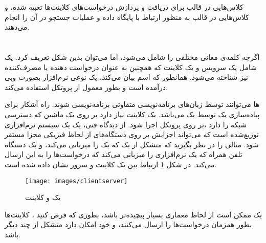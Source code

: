 \documentclass[oneside]{report}
\begin{document}
		کلاس‌هایی در قالب 
		{\normalsize{}}
		برای دریافت و پردازش درخواست‌های کلاینت‌ها تعبیه شده، و کلاس‌هایی در قالب
		{\normalsize{}}
		به منظور ارتباط با پایگاه داده و عملیات جستجو در آن‌ را انجام می‌دهند. 
		
	\section{{\large{}}}
اگرچه کلمه‌ی 
{\normalsize{}}
معانی مختلفی را شامل می‌شود، اما می‌توان بدین شکل تعریف کرد. یک 
{\normalsize{}}
شامل یک سرویس و یک کلاینت که همچنین به عنوان درخواست دهنده یا مصرف‌کننده نیز شناخته می‌شود. همانطور که  اسم 
{\normalsize{}}
بیان می‌کند، یک 
{\normalsize{}}
نوعی نرم‌افزار بصورت وبی درآمده است و بطور معمول از پروتکل 
{\normalsize{}}
استفاده می‌کند. 
		
		{\normalsize{}} ها
		می‌توانند توسط زبان‌های برنامه‌نویسی متفاوتی برنامه‌نویسی شوند. راه آشکار برای پیاده‌سازی یک 
		{\normalsize{}}
		توسط یک 
		{\normalsize{}}
		می‌باشد. یک کلاینت 
		{\normalsize{}}
	نیاز دارد بر روی یک ماشین که دسترسی شبکه را دارد ،بر روی پروتکل
			{\normalsize{}}
			اجرا شود. از دیدگاه فنی،  یک
					{\normalsize{}} 
			یک سیستم نرم‌افزاری توزیع‌شده است که می‌تواند اجزایش بر روی دستگاه‌های از لحاظ فیزیکی مجزا مستقر شود. 
			مثالی را در نظر بگیرید که متشکل از یک 
					{\normalsize{}}
	که یک 
			{\normalsize{}}
			را میزبانی می‌کند، و یک دستگاه تلفن همراه که یک نرم‌افزاری را میزبانی می‌کند که درخواست‌ها را به این 
					{\normalsize{}}
					ارسال می‌‌کند. در شکل 
					\ref{fig:clientserver}
	ارتباط بین یک کلاینت و سرور نشان داده شده است. 
					
					\begin{figure}[h]
						\centering
						\texttt{[image: images/clientserver]}
						\caption{یک {\footnotesize{}} و کلاینت}
						\label{fig:clientserver}
					\end{figure}
یک 
		{\normalsize{}}
		ممکن است از لحاظ معماری بسیار پیچیده‌تر باشد، بطوری که فرض کنید ، کلاینت‌ها بطور همزمان درخواست‌ها را ارسال می‌کنند، و خود 
				{\normalsize{}}
				امکان دارد متشکل از چند 
						{\normalsize{}}
						دیگر باشد. 					
					
\end{document}

